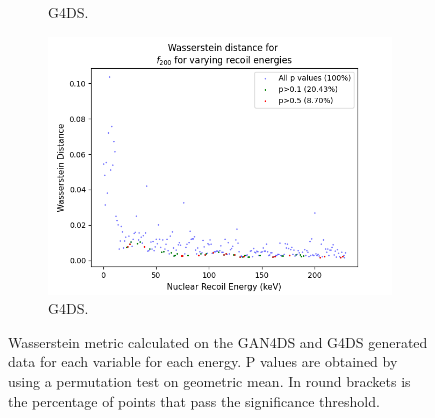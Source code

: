 \documentclass[11pt]{article} %
\begin{document}
\begin{figure}[H]
\begin{minipage}{\textwidth}
\begin{subfigure}{.5\textwidth}
      \caption{G4DS.}
  \end{subfigure}
\end{minipage}
\begin{minipage}{\textwidth}
  \centering
  \begin{subfigure}{.5\textwidth}
      \centering\captionsetup{width=.8\linewidth}%
      \includegraphics[scale=0.6]{./images/wasserstein_distance_f200like.png}
      \caption{G4DS.}
  \end{subfigure}
\end{minipage}
\caption{Wasserstein metric calculated on the GAN4DS and G4DS generated data for each variable for each energy. P values are
obtained by using a permutation test on geometric mean. In round brackets is the percentage of points that pass the significance threshold.}
\label{fig:wass_distance}
\end{figure}
\end{document}
